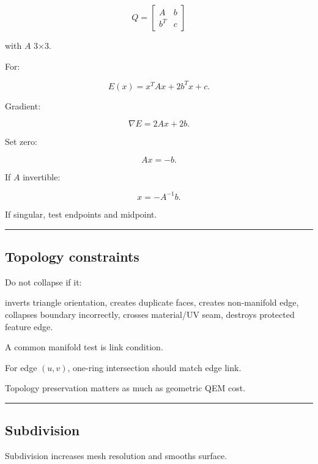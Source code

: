 \[
Q=
\begin{bmatrix}
A&b\\
b^T&c
\end{bmatrix}
\]

with \(A\) 3×3.

For:

\[
E(x)=x^TAx+2b^Tx+c.
\]

Gradient:

\[
\nabla E=
2Ax+2b.
\]

Set zero:

\[
\boxed{
Ax=-b.
}
\]

If \(A\) invertible:

\[
x=-A^{-1}b.
\]

If singular, test endpoints and midpoint.

\begin{center}\rule{0.5\linewidth}{0.5pt}\end{center}

\subsection{Topology constraints}\label{04-visual-computing-ii-ch041-topology-constraints}

\hypertarget{04-visual-computing-ii-ch041-topology-constraints}{}

Do not collapse if it:

inverts triangle orientation, creates duplicate faces, creates non-manifold edge, collapses boundary incorrectly, crosses material/UV seam, destroys protected feature edge.

A common manifold test is link condition.

For edge \((u,v)\), one-ring intersection should match edge link.

Topology preservation matters as much as geometric QEM cost.

\begin{center}\rule{0.5\linewidth}{0.5pt}\end{center}

\subsection{Subdivision}\label{04-visual-computing-ii-ch041-subdivision}

\hypertarget{04-visual-computing-ii-ch041-subdivision}{}

Subdivision increases mesh resolution and smooths surface.

